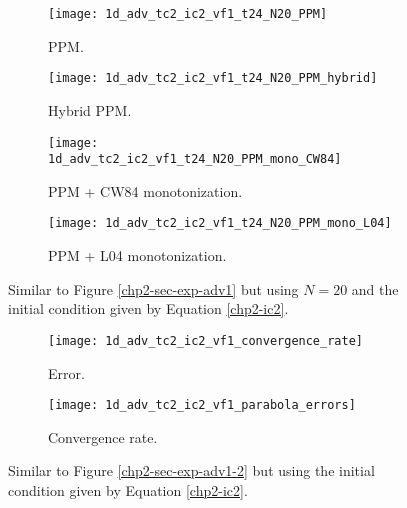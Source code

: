 \newpage

\begin{figure}[!htb]
  \centering
  \begin{subfigure}{0.49\textwidth}
    \centering
			\texttt{[image: 1d\_adv\_tc2\_ic2\_vf1\_t24\_N20\_PPM]}
			\caption{PPM.\label{chp2-sec-exp-adv2-a}}
  \end{subfigure}
  \begin{subfigure}{0.49\textwidth}
    \centering
			\texttt{[image: 1d\_adv\_tc2\_ic2\_vf1\_t24\_N20\_PPM\_hybrid]}
			\caption{Hybrid PPM.\label{chp2-sec-exp-adv2-b}}
  \end{subfigure}

  \begin{subfigure}{0.49\textwidth}
    \centering
		\texttt{[image: 1d\_adv\_tc2\_ic2\_vf1\_t24\_N20\_PPM\_mono\_CW84]}
    \caption{PPM + CW84 monotonization.\label{chp2-sec-exp-adv2-c}}
  \end{subfigure}
  \begin{subfigure}{0.49\textwidth}
    \centering
			\texttt{[image: 1d\_adv\_tc2\_ic2\_vf1\_t24\_N20\_PPM\_mono\_L04]}
      \caption{PPM + L04 monotonization.\label{chp2-sec-exp-adv2-d}}
  \end{subfigure} 
	\caption{ Similar to Figure \ref{chp2-sec-exp-adv1} but using $N=20$
	and the initial condition given by Equation \eqref{chp2-ic2}.\label{chp2-sec-exp-adv2}}
\end{figure}

\begin{figure}[!htb]
  \centering
  \begin{subfigure}{0.49\textwidth}
    \centering
		\texttt{[image: 1d\_adv\_tc2\_ic2\_vf1\_convergence\_rate]}
		\caption{Error.\label{chp2-sec-exp-adv2-error}}
  \end{subfigure}
  \begin{subfigure}{0.49\textwidth}
    \centering
			\texttt{[image: 1d\_adv\_tc2\_ic2\_vf1\_parabola\_errors]}
		\caption{Convergence rate.\label{chp2-sec-exp-adv2-CR}}
  \end{subfigure}
	\caption{ Similar to Figure \ref{chp2-sec-exp-adv1-2} but using
	the initial condition given by Equation \eqref{chp2-ic2}. \label{chp2-sec-exp-adv2-2}}
\end{figure}

\newpage

